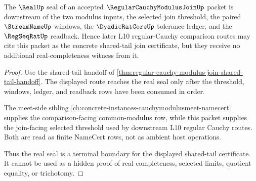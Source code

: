 \begin{theorem}
\label{thm:regular-cauchy-modulus-join-real-seal-route}
The $\RealUp$ seal of an accepted $\RegularCauchyModulusJoinUp$ packet is downstream of the two modulus inputs, the selected join threshold, the paired $\StreamNameUp$ windows, the $\DyadicRatCoreUp$ tolerance ledger, and the $\RegSeqRatUp$ readback. Hence later L10 regular-Cauchy comparison routes may cite this packet as the concrete shared-tail join certificate, but they receive no additional real-completeness witness from it.
\end{theorem}
\begin{proof}
Use the shared-tail handoff of \autoref{thm:regular-cauchy-modulus-join-shared-tail-handoff}. The displayed route reaches the real seal only after the threshold, windows, ledger, and readback rows have been consumed in order.

The meet-side sibling \autoref{ch:concrete-instances-cauchymodulusmeet-namecert} supplies the comparison-facing common-modulus row, while this packet supplies the join-facing selected threshold used by downstream L10 regular Cauchy routes. Both are read as finite NameCert rows, not as ambient host operations.

Thus the real seal is a terminal boundary for the displayed shared-tail certificate. It cannot be used as a hidden proof of real completeness, selected limits, quotient equality, or trichotomy.
\end{proof}




